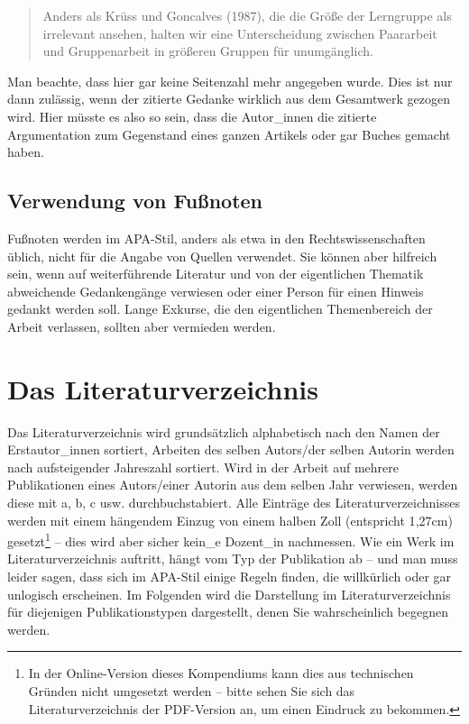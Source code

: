 \documentclass[ngerman,oneside,12pt,a4paper]{scrbook}
\begin{document}
\begin{quote}
Anders als Krüss und Goncalves (1987), die die Größe der Lerngruppe als
irrelevant ansehen, halten wir eine Unterscheidung zwischen Paararbeit
und Gruppenarbeit in größeren Gruppen für unumgänglich.
\end{quote}

Man beachte, dass hier gar keine Seitenzahl mehr angegeben wurde. Dies
ist nur dann zulässig, wenn der zitierte Gedanke wirklich aus dem
Gesamtwerk gezogen wird. Hier müsste es also so sein, dass die
Autor\_innen die zitierte Argumentation zum Gegenstand eines ganzen
Artikels oder gar Buches gemacht haben.

\subsection*{Verwendung von Fußnoten}\label{verwendung-von-fuuxdfnoten}

Fußnoten werden im APA-Stil, anders als etwa in den Rechtswissenschaften
üblich, nicht für die Angabe von Quellen verwendet. Sie können aber
hilfreich sein, wenn auf weiterführende Literatur und von der
eigentlichen Thematik abweichende Gedankengänge verwiesen oder einer
Person für einen Hinweis gedankt werden soll. Lange Exkurse, die den
eigentlichen Themenbereich der Arbeit verlassen, sollten aber vermieden
werden.

\section{Das Literaturverzeichnis}\label{das-literaturverzeichnis}

Das Literaturverzeichnis wird grundsätzlich alphabetisch nach den Namen
der Erstautor\_innen sortiert, Arbeiten des selben Autors/der selben
Autorin werden nach aufsteigender Jahreszahl sortiert. Wird in der
Arbeit auf mehrere Publikationen eines Autors/einer Autorin aus dem
selben Jahr verwiesen, werden diese mit a, b, c usw. durchbuchstabiert.
Alle Einträge des Literaturverzeichnisses werden mit einem hängendem
Einzug von einem halben Zoll (entspricht 1{,}27cm) gesetzt\footnote{In
  der Online-Version dieses Kompendiums kann dies aus technischen
  Gründen nicht umgesetzt werden -- bitte sehen Sie sich das
  Literaturverzeichnis der PDF-Version an, um einen Eindruck zu
  bekommen.} -- dies wird aber sicher kein\_e Dozent\_in nachmessen. Wie
ein Werk im Literaturverzeichnis auftritt, hängt vom Typ der Publikation
ab -- und man muss leider sagen, dass sich im APA-Stil einige Regeln
finden, die willkürlich oder gar unlogisch erscheinen. Im Folgenden wird
die Darstellung im Literaturverzeichnis für diejenigen Publikationstypen
dargestellt, denen Sie wahrscheinlich begegnen werden.
\end{document}
